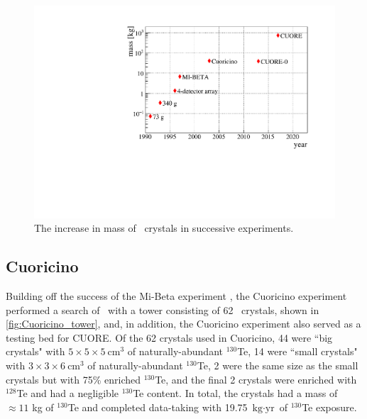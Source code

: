 \begin{figure}[htbp]
    \centering
    \includegraphics[width=\linewidth]{Figures/bolometer_mass_over_time.pdf}
    \caption[The increase in mass of \teotwo~crystals in successive experiments.]
    {The increase in mass of \teotwo~crystals in successive experiments.}
    \label{fig:bolometer_mass_over_time}
\end{figure}

\subsection{Cuoricino}
Building off the success of the Mi-Beta experiment \cite{Pirro:2002gw}, the Cuoricino experiment \cite{Andreotti:2010vj} performed a search of \zeronubb~with a tower consisting of 62 \teotwo~crystals, shown in \autoref{fig:Cuoricino_tower}, and, in addition, the Cuoricino experiment also served as a testing bed for CUORE.
Of the 62 crystals used in Cuoricino, 44 were ``big crystals" with $5\times5\times5~\textrm{cm}^3$ of naturally-abundant $^{130}$Te, 14 were ``small crystals" with $3\times3\times6~\textrm{cm}^3$ of naturally-abundant $^{130}$Te, 2 were the same size as the small crystals but with 75\% enriched $^{130}$Te, and the final 2 crystals were enriched with $^{128}$Te and had a negligible $^{130}$Te content.
In total, the crystals had a mass of $\approx11$ kg of $^{130}$Te and completed data-taking with 19.75 $\textrm{kg}\cdot \textrm{yr}$ of $^{130}$Te exposure.

